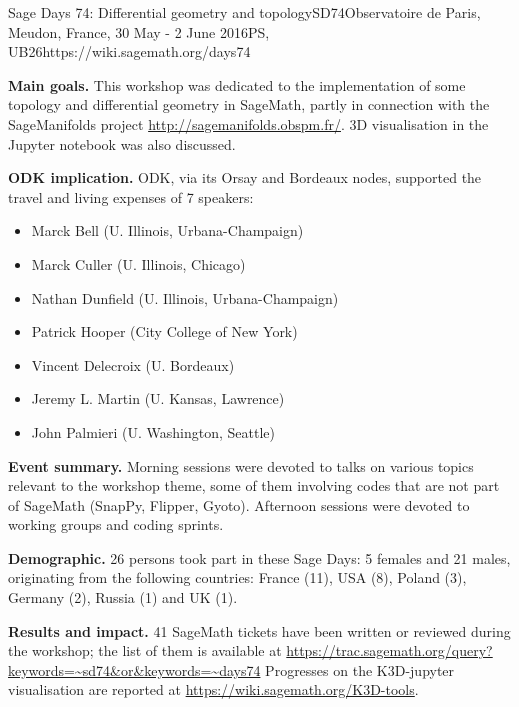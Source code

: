 \begin{event}{Sage Days 74: Differential geometry and topology}{SD74}{Observatoire de Paris, Meudon, France, 30 May - 2 June 2016}{PS, UB}{26}{https://wiki.sagemath.org/days74}

\textbf{Main goals.} This workshop was dedicated to the implementation of some
topology and differential geometry in SageMath, partly in connection with the
SageManifolds project \url{http://sagemanifolds.obspm.fr/}. 3D visualisation
in the Jupyter notebook was also discussed.

\textbf{ODK implication.} ODK, via its Orsay and Bordeaux nodes, supported the travel and living expenses of 7 speakers:
\begin{itemize}
\item Marck Bell (U. Illinois, Urbana-Champaign)
\item Marck Culler (U. Illinois, Chicago)
\item Nathan Dunfield (U. Illinois, Urbana-Champaign)
\item Patrick Hooper (City College of New York)
\item Vincent Delecroix (U. Bordeaux)
\item Jeremy L. Martin (U. Kansas, Lawrence)
\item John Palmieri (U. Washington, Seattle)
\end{itemize}

\textbf{Event summary.} Morning sessions were devoted to talks on various
topics relevant to the workshop theme, some of them involving codes that are
not part of SageMath (SnapPy, Flipper, Gyoto).
Afternoon sessions were devoted to working groups and coding sprints.

\textbf{Demographic.}
26 persons took part in these Sage Days: 5 females and 21 males, originating
from the following countries: France (11), USA (8), Poland (3), Germany (2), Russia (1) and UK (1).


\textbf{Results and impact.}
41 SageMath tickets have been written or reviewed during the workshop; the list
of them is available at \url{https://trac.sagemath.org/query?keywords=~sd74&or&keywords=~days74}
Progresses on the K3D-jupyter visualisation are reported at
\url{https://wiki.sagemath.org/K3D-tools}.

\end{event}
